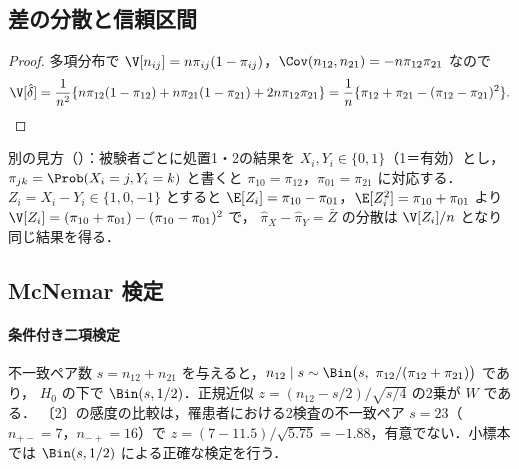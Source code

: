 \subsection{差の分散と信頼区間}
\begin{proof}
多項分布で $\V[n_{ij}]=n\pi_{ij}(1-\pi_{ij})$，$\Cov(n_{12},n_{21})=-n\pi_{12}\pi_{21}$ なので
\[
\V[\hat\delta]=\frac{1}{n^2}\{n\pi_{12}(1-\pi_{12})+n\pi_{21}(1-\pi_{21})+2n\pi_{12}\pi_{21}\}
=\frac1n\{\pi_{12}+\pi_{21}-(\pi_{12}-\pi_{21})^2\}.
\]
\end{proof}
別の見方（）：被験者ごとに処置1・2の結果を $X_i,Y_i\in\{0,1\}$（1＝有効）とし，$\pi_{jk}=\Prob(X_i=j,Y_i=k)$ と書くと $\pi_{10}=\pi_{12}$，$\pi_{01}=\pi_{21}$ に対応する．$Z_i=X_i-Y_i\in\{1,0,-1\}$ とすると
$\E[Z_i]=\pi_{10}-\pi_{01}$，$\E[Z_i^2]=\pi_{10}+\pi_{01}$ より $\V[Z_i]=(\pi_{10}+\pi_{01})-(\pi_{10}-\pi_{01})^2$ で，
$\hat\pi_X-\hat\pi_Y=\bar Z$ の分散は $\V[Z_i]/n$ となり同じ結果を得る．

\subsection{McNemar 検定}
\paragraph{条件付き二項検定}
不一致ペア数 $s=n_{12}+n_{21}$ を与えると，$n_{12}\mid s\sim\Bin\bigl(s,\ \pi_{12}/(\pi_{12}+\pi_{21})\bigr)$ であり，
$H_0$ の下で $\Bin(s,1/2)$．正規近似 $z=(n_{12}-s/2)/\sqrt{s/4}$ の2乗が $W$ である．
〔2〕の感度の比較は，罹患者における2検査の不一致ペア $s=23$（$n_{+-}=7$，$n_{-+}=16$）で
$z=(7-11.5)/\sqrt{5.75}=-1.88$，有意でない．小標本では $\Bin(s,1/2)$ による正確な検定を行う．

